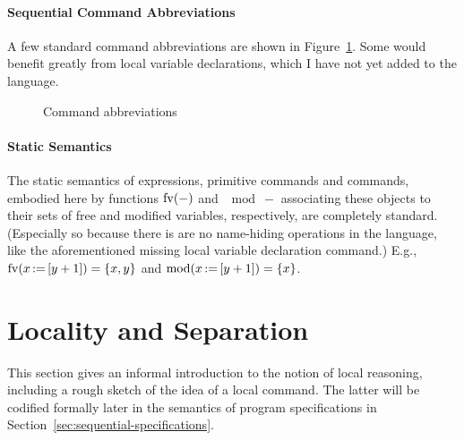 \documentclass[11pt]{report}
\begin{document}
\paragraph{Sequential Command Abbreviations} A few standard command abbreviations are shown in Figure~\ref{fig:sequential-command-abbreviations}. Some would benefit greatly from local variable declarations, which I have not yet added to the language. 

\begin{figure}[ht]
    \centering
    \caption{\label{fig:sequential-command-abbreviations} Command abbreviations}
\end{figure}

\paragraph{Static Semantics} The static semantics of expressions, primitive commands and commands, embodied here by functions $\mathrm{fv}(-)$ and $\mod{-}$ associating these objects to their sets of free and modified variables, respectively, are completely standard. (Especially so because there is are no name-hiding operations in the language, like the aforementioned missing local variable declaration command.) E.g., $\mathrm{fv}(x \operatorname{:\!=} \left[ y+1 \right]) = \left\lbrace x,y \right\rbrace$ and $\mathrm{mod}(x \operatorname{:\!=} \left[ y+1 \right]) = \left\lbrace x \right\rbrace$.  

\section{Locality and Separation}
\label{sec:locality}

This section gives an informal introduction to the notion of local reasoning, including a rough sketch of the idea of a local command. The latter will be codified formally later in the semantics of program specifications in Section~\ref{sec:sequential-specifications}. 
\end{document}
